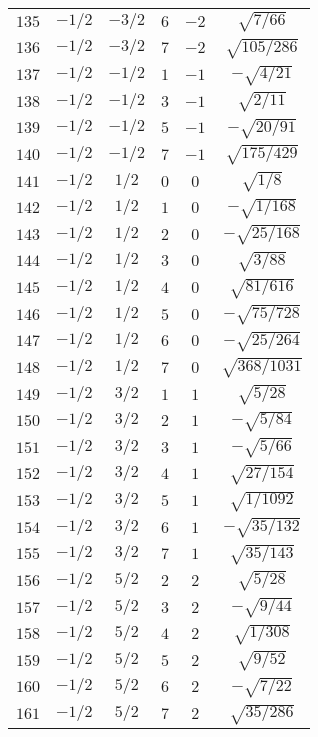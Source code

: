 \begin{table}
\begin{center}
\begin{tabular}{|c|c|c|c|c|c|}
$135$ & $-1/2$ & $-3/2$ & $6$ & $-2$ & $\sqrt{7/66}$ \\ 
$136$ & $-1/2$ & $-3/2$ & $7$ & $-2$ & $\sqrt{105/286}$ \\ 
$137$ & $-1/2$ & $-1/2$ & $1$ & $-1$ & $-\sqrt{4/21}$ \\ 
$138$ & $-1/2$ & $-1/2$ & $3$ & $-1$ & $\sqrt{2/11}$ \\ 
$139$ & $-1/2$ & $-1/2$ & $5$ & $-1$ & $-\sqrt{20/91}$ \\ 
$140$ & $-1/2$ & $-1/2$ & $7$ & $-1$ & $\sqrt{175/429}$ \\ 
$141$ & $-1/2$ & $1/2$ & $0$ & $0$ & $\sqrt{1/8}$ \\ 
$142$ & $-1/2$ & $1/2$ & $1$ & $0$ & $-\sqrt{1/168}$ \\ 
$143$ & $-1/2$ & $1/2$ & $2$ & $0$ & $-\sqrt{25/168}$ \\ 
$144$ & $-1/2$ & $1/2$ & $3$ & $0$ & $\sqrt{3/88}$ \\ 
$145$ & $-1/2$ & $1/2$ & $4$ & $0$ & $\sqrt{81/616}$ \\ 
$146$ & $-1/2$ & $1/2$ & $5$ & $0$ & $-\sqrt{75/728}$ \\ 
$147$ & $-1/2$ & $1/2$ & $6$ & $0$ & $-\sqrt{25/264}$ \\ 
$148$ & $-1/2$ & $1/2$ & $7$ & $0$ & $\sqrt{368/1031}$ \\ 
$149$ & $-1/2$ & $3/2$ & $1$ & $1$ & $\sqrt{5/28}$ \\ 
$150$ & $-1/2$ & $3/2$ & $2$ & $1$ & $-\sqrt{5/84}$ \\ 
$151$ & $-1/2$ & $3/2$ & $3$ & $1$ & $-\sqrt{5/66}$ \\ 
$152$ & $-1/2$ & $3/2$ & $4$ & $1$ & $\sqrt{27/154}$ \\ 
$153$ & $-1/2$ & $3/2$ & $5$ & $1$ & $\sqrt{1/1092}$ \\ 
$154$ & $-1/2$ & $3/2$ & $6$ & $1$ & $-\sqrt{35/132}$ \\ 
$155$ & $-1/2$ & $3/2$ & $7$ & $1$ & $\sqrt{35/143}$ \\ 
$156$ & $-1/2$ & $5/2$ & $2$ & $2$ & $\sqrt{5/28}$ \\ 
$157$ & $-1/2$ & $5/2$ & $3$ & $2$ & $-\sqrt{9/44}$ \\ 
$158$ & $-1/2$ & $5/2$ & $4$ & $2$ & $\sqrt{1/308}$ \\ 
$159$ & $-1/2$ & $5/2$ & $5$ & $2$ & $\sqrt{9/52}$ \\ 
$160$ & $-1/2$ & $5/2$ & $6$ & $2$ & $-\sqrt{7/22}$ \\ 
$161$ & $-1/2$ & $5/2$ & $7$ & $2$ & $\sqrt{35/286}$ \\ 

\end{tabular}
\end{center}
\end{table}

